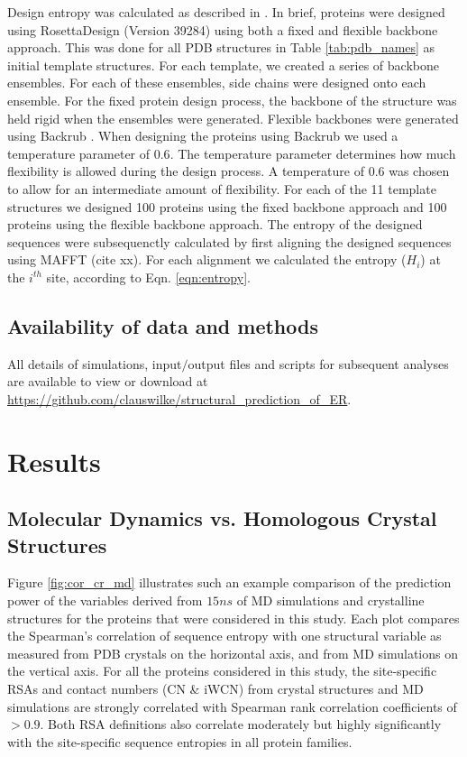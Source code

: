 \documentclass[12pt]{article}
\begin{document}
Design entropy was calculated as described in \citep{Jacksonetal2013}. In brief, proteins were designed using RosettaDesign (Version 39284) \citep{leaver-fay_rosetta3:_2011} using both a fixed and flexible backbone approach. This was done for all PDB structures in Table \ref{tab:pdb_names} as initial template structures. For each template, we created a series of backbone ensembles. For each of these ensembles, side chains were designed onto each ensemble. For the fixed protein design process, the backbone of the structure was held rigid when the ensembles were generated.  Flexible backbones were generated  using Backrub \citep{smith_backrub-like_2008}. When designing the proteins using Backrub we used a temperature parameter of $0.6$. The temperature parameter determines how much flexibility is allowed during the design process. A temperature of 0.6 was chosen to allow for an intermediate amount of flexibility.   For each of the 11 template structures we designed 100 proteins using the fixed backbone approach and 100 proteins using the flexible backbone approach. The entropy of the designed sequences were subsequenctly calculated by first aligning the designed sequences using MAFFT (cite xx). For each alignment we calculated the entropy ($H_i$) at the $i^{th}$ site, according to Eqn. \ref{eqn:entropy}.

\subsection*{Availability of data and methods}

All details of simulations, input$/$output files and scripts for subsequent analyses are available to view or download at \url{https://github.com/clauswilke/structural\_prediction\_of\_ER}.

\section*{Results}

\subsection*{Molecular Dynamics vs. Homologous Crystal Structures}



Figure \ref{fig:cor_cr_md} illustrates such an example comparison of the prediction power of the variables derived from $15ns$ of MD simulations and crystalline structures for the proteins that were considered in this study. Each plot compares the Spearman's correlation of sequence entropy with one structural variable as measured from PDB crystals on the horizontal axis, and from MD simulations on the vertical axis. For all the proteins considered in this study, the site-specific RSAs and contact numbers (CN \& iWCN) from crystal structures and MD simulations are strongly correlated with Spearman rank correlation coefficients of $>0.9$. Both RSA definitions also correlate moderately but highly significantly with the site-specific sequence entropies in all protein families.
\end{document}
